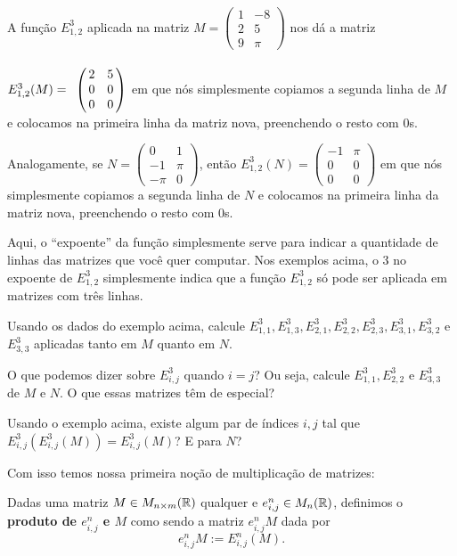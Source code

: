 \begin{ex}
	A função $E^{3}_{1,2}$ aplicada na matriz $M=\begin{pmatrix}
	1 & -8\\
	2 & 5\\
	9 & \pi
	\end{pmatrix}$ nos dá a matriz \(E^3_{1,2}(M)=\bordermatrix{
	&&\cr
	& 2 & 5\cr
	& 0 &0\cr
	&0 &0
	}\) em que nós simplesmente copiamos a segunda linha de $M$ e colocamos na primeira linha da matriz nova, preenchendo o resto com $0$s.

	Analogamente, se $N=\begin{pmatrix}
	0 & 1\\
	-1 & \pi\\
	-\pi & 0
	\end{pmatrix}$, então $E^3_{1,2}(N)=\begin{pmatrix}
	-1 & \pi\\
	0 & 0\\
	0 & 0
	\end{pmatrix}$ em que nós simplesmente copiamos a segunda linha de $N$ e colocamos na primeira linha da matriz nova, preenchendo o resto com $0$s.
\end{ex}

\begin{rmk}
	Aqui, o ``expoente'' da função simplesmente serve para indicar a quantidade de linhas das matrizes que você quer computar. Nos exemplos acima, o 3 no expoente de $E^3_{1,2}$ simplesmente indica que a função $E^3_{1,2}$ só pode ser aplicada em matrizes com três linhas.
\end{rmk}
\begin{exerc}
	Usando os dados do exemplo acima, calcule $E^3_{1,1}, E^3_{1,3}, E^3_{2,1}, E^3_{2,2}, E^3_{2,3},E^3_{3,1}, E^3_{3,2}$ e $E^3_{3,3}$ aplicadas tanto em $M$ quanto em $N$.
	
	O que podemos dizer sobre $E^3_{i,j}$ quando $i=j$? Ou seja, calcule $E^3_{1,1},E^3_{2,2}$ e $E^3_{3,3}$ de $M$ e $N$. O que essas matrizes têm de especial?
\end{exerc}
\begin{exerc}
	Usando o exemplo acima, existe algum par de índices $i,j$ tal que $E^3_{i,j}(E^3_{i,j}(M))=E^3_{i,j}(M)$? E para $N$?
\end{exerc}

Com isso temos nossa primeira noção de multiplicação de matrizes:

\begin{df}
	Dadas uma matriz $M\in M_{n\times m}(\mathbb R)$ qualquer e $e^n_{i,j}\in M_n(\mathbb R)$, definimos o \textbf{produto de $e^n_{i,j}$ e $M$} como sendo a matriz $e^n_{i,j}M$ dada por
	\[e^n_{i,j}M:=E^n_{i,j}(M).\]
\end{df}

